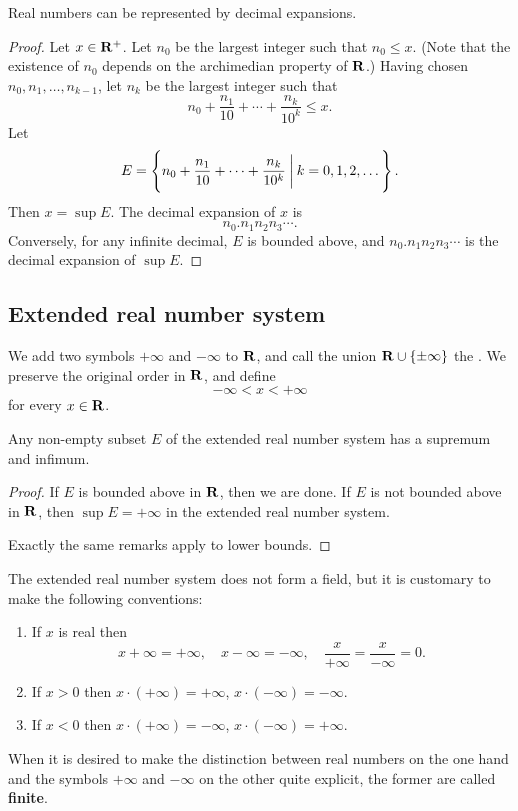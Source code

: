 \begin{proposition}
Real numbers can be represented by decimal expansions.
\end{proposition}

\begin{proof}
Let $x\in\mathbf R^+$. Let $n_0$ be the largest integer such that $n_0\le x$. (Note that the existence of $n_0$ depends on the archimedian property of $\mathbf R$.) Having chosen $n_0,n_1,\dots,n_{k-1}$, let $n_k$ be the largest integer such that
\[n_0+\frac{n_1}{10}+\cdots+\frac{n_k}{10^k}\le x.\]
Let
\[E=\left\{n_0+\frac{n_1}{10}+\cdots+\frac{n_k}{10^k}\:\bigg|\:k=0,1,2,\dots\right\}.\]
Then $x=\sup E$. The decimal expansion of $x$ is
\[n_0.n_1n_2n_3\cdots.\]
Conversely, for any infinite decimal, $E$ is bounded above, and $n_0.n_1n_2n_3\cdots$ is the decimal expansion of $\sup E$.
\end{proof}

\subsection{Extended real number system}
\begin{definition}
We add two symbols $+\infty$ and $-\infty$ to $\mathbf R$, and call the union $\mathbf R\cup\{\pm\infty\}$ the . We preserve the original order in $\mathbf R$, and define
\[-\infty<x<+\infty\]
for every $x\in\mathbf R$.
\end{definition}

\begin{proposition}
Any non-empty subset $E$ of the extended real number system has a supremum and infimum.
\end{proposition}

\begin{proof}
If $E$ is bounded above in $\mathbf R$, then we are done. If $E$ is not bounded above in $\mathbf R$, then $\sup E=+\infty$ in the extended real number system.

Exactly the same remarks apply to lower bounds.
\end{proof}

The extended real number system does not form a field, but it is customary to make the following conventions:
\begin{enumerate}[label=(\arabic*)]
\item If $x$ is real then
\[ x+\infty=+\infty, \quad x-\infty=-\infty, \quad \frac{x}{+\infty}=\frac{x}{-\infty}=0. \]
\item If $x>0$ then $x\cdot(+\infty)=+\infty$, $x\cdot(-\infty)=-\infty$.
\item If $x<0$ then $x\cdot(+\infty)=-\infty$, $x\cdot(-\infty)=+\infty$.
\end{enumerate}
When it is desired to make the distinction between real numbers on the one hand and the symbols $+\infty$ and $-\infty$ on the other quite explicit, the former are called \textbf{finite}.

